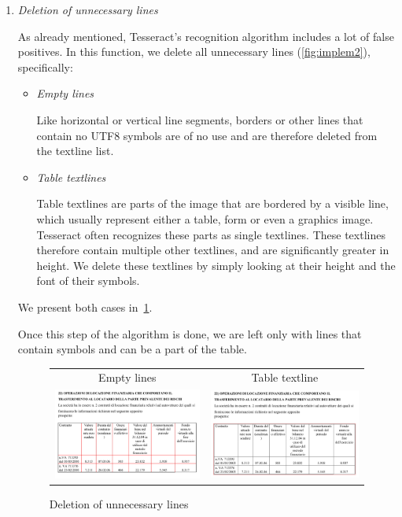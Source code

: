 \begin{enumerate}
\item \emph{Deletion of unnecessary lines}

As already mentioned, Tesseract's recognition algorithm includes a lot of false positives. In this function, we delete all unnecessary lines (\cref{fig:implem2}), specifically:

\begin{itemize}
\item \emph{Empty lines}

Like horizontal or vertical line segments, borders or other lines that contain no UTF8 symbols are of no use and are therefore deleted from the textline list.

\item \emph{Table textlines}

Table textlines are parts of the image that are bordered by a visible line, which usually represent either a table, form or even a graphics image. Tesseract often recognizes these parts as single textlines. These textlines therefore contain multiple other textlines, and are significantly greater in height. We delete these textlines by simply looking at their height and the font of their symbols.
\end{itemize}

We present both cases in~\cref{fig:deletionOfLines}.

Once this step of the algorithm is done, we are left only with lines that contain symbols and can be a part of the table.

\begin{figure}
\centering
{\sffamily
\begin{tabular}{cc}
Empty lines & Table textline \\
\includegraphics[width=0.4\linewidth]{img/implementation/textlineEmpty.png}
&
\includegraphics[width=0.4\linewidth]{img/implementation/textlineTable.png}\\
\end{tabular}
}
\caption{Deletion of unnecessary lines}
\label{fig:deletionOfLines}
\end{figure}


\end{enumerate}
